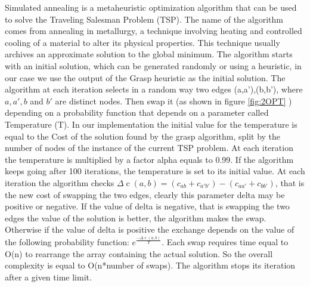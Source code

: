 Simulated annealing is a metaheuristic optimization algorithm that can be used to solve the Traveling Salesman Problem (TSP).
The name of the algorithm comes from annealing in metallurgy, a technique involving heating and controlled cooling of a material to alter its physical properties. This technique usually archives an approximate solution to the global minimum.
The algorithm starts with an initial solution, which can be generated randomly or using a heuristic, in our case we use the output of the Grasp heuristic as the initial solution.
The algorithm at each iteration selects in a random way two edges (a,a'),(b,b'), where $a,a',b$ and $b'$ are distinct nodes. Then swap it (as shown in figure \ref{fig:2OPT} ) depending on a probability function that depends on a parameter called Temperature (T).
In our implementation the initial value for the temperature is equal to the Cost of the solution found by the grasp algorithm, split by the number of nodes of the instance of the current TSP problem. At each iteration the temperature is multiplied by a factor alpha equals to 0.99. If the algorithm keeps going after 100 iterations, the temperature is set to its initial value.
At each iteration the algorithm checks $\Delta \operatorname{c}(a,b) = (c_{ab} + c_{a'b'}) - (c_{aa'} + c_{bb'})$, that is the new cost of swapping the two edges, clearly this parameter delta may be positive or negative. If the value of delta is negative, that is swapping the two edges the value of the solution is better, the algorithm makes the swap. Otherwise if the value of delta is positive the exchange depends on the value of the following probability function: $e^{\frac{-\Delta \operatorname{c}(a,b)}{T}}$.
Each swap requires time equal to O(n) to rearrange the array containing the actual solution. So the overall complexity is equal to O(n*number of swaps).
The algorithm stops its iteration after a given time limit.

